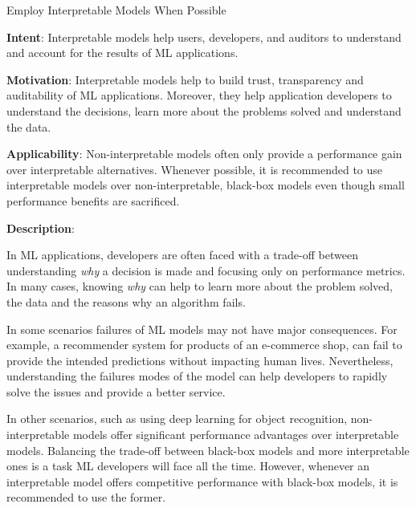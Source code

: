   
  \begin{frame}[plain]{ Employ Interpretable Models When Possible
 }

  \textbf{Intent}: Interpretable models help users, developers, and auditors to understand and account for the results of ML applications. 
 

  \textbf{Motivation}: Interpretable models help to build trust, transparency and auditability of ML applications. Moreover, they help application developers to understand the decisions, learn more about the problems solved and understand the data.  
 

  \textbf{Applicability}: Non-interpretable models often only provide a performance gain over interpretable alternatives. Whenever possible, it is recommended to use interpretable models over non-interpretable, black-box models even though small performance benefits are sacrificed. 
 

  \textbf{Description}: 

In ML applications, developers are often faced with a trade-off between understanding \emph{why} a decision is made and focusing only on performance metrics.
In many cases, knowing \emph{why} can help to learn more about the problem solved, the data and the reasons why an algorithm fails.


In some scenarios failures of ML models may not have major consequences.
For example, a recommender system for products of an e-commerce shop, can fail to provide the intended predictions without impacting human lives.
Nevertheless, understanding the failures modes of the model can help developers to rapidly solve the issues and provide a better service.


In other scenarios, such as using deep learning for object recognition, non-interpretable models offer significant performance advantages over interpretable models.
Balancing the trade-off between black-box models and more interpretable ones is a task ML developers will face all the time.
However, whenever an interpretable model offers competitive performance with black-box models, it is recommended to use the former.


 


  \end{frame}

